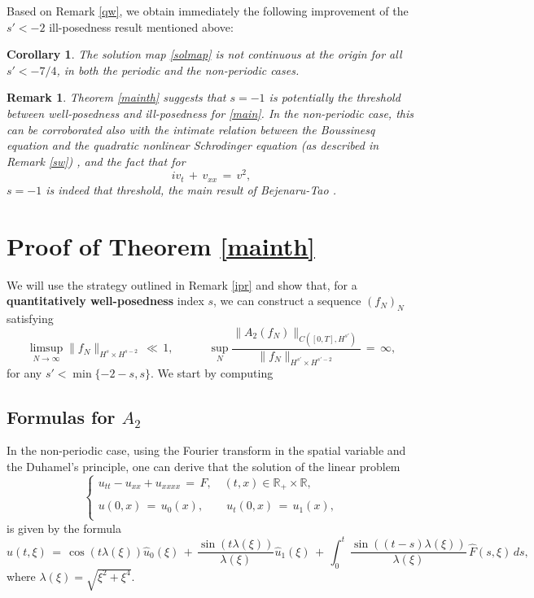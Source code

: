 \documentclass{amsart}
\newtheorem{corollary}[theorem]{Corollary}
\newtheorem{remark}[theorem]{Remark}
\begin{document}
Based on Remark \ref{qw}, we obtain immediately the following improvement of the $s'<-2$ ill-posedness result mentioned above:

\begin{corollary}
The solution map \eqref{solmap} is not continuous at the origin for all $s'<-7/4$, in both the periodic and the non-periodic cases.
\end{corollary}

\begin{remark}
Theorem \ref{mainth} suggests that $s=-1$ is potentially the threshold between well-posedness and ill-posedness for \eqref{main}.  In the non-periodic case, this can be corroborated also with the intimate relation between the Boussinesq equation and the quadratic nonlinear Schrodinger equation (as described in Remark \ref{sw}) , and the fact that for 
\[
iv_t\,+\,v_{xx}\,=\,v^2,
\]
$s=-1$ is indeed that threshold, the main result of Bejenaru-Tao \cite{BT06}. 
\end{remark}


\section{Proof of Theorem \ref{mainth}}
We will use the strategy outlined in Remark \ref{ipr} and show that, for a \textbf{quantitatively well-posedness}  index $s$, we can construct a sequence $(f_N)_N$ satisfying
\[
\limsup_{N\to \infty} \|f_N\|_{H^s \times H^{s-2}}\,\ll\,1, \qquad \quad \sup_N \frac{\|A_2(f_N)\|_{C([0,T],H^{s'})}}{\|f_N\|_{H^{s'} \times H^{s'-2}}}\,=\,\infty,\]
for any $s'< \min\{-2-s, s\}$. We start by computing


\subsection{Formulas for $A_2$} In the non-periodic case, using the Fourier transform in the spatial variable and the Duhamel's principle, one can derive that the solution of the linear problem
\begin{equation}
\left\{
\begin{array}{l}
u_{tt}-u_{xx}+u_{xxxx}\,=\,F, \quad (t,x)\in \mathbb{R}_+\times\mathbb{R},\\
\\
u(0,x)\,=\,u_0(x),\qquad u_t(0,x)\,=\,u_1(x),\\
\end{array}\right.
\label{hom}
\end{equation}
is given by the formula
\begin{equation}
\hat{u}(t,\xi)\,=\,\cos(t \lambda(\xi)) \hat{u}_0(\xi)\,+\,\frac{\sin(t \lambda(\xi))}{\lambda(\xi)} \hat{u}_1(\xi)\,+\,\int_0^t\,\frac{\sin((t-s) \lambda(\xi))}{\lambda(\xi)} \,\hat{F}(s,\xi)\,ds,
\label{lin}\end{equation}
where $\lambda(\xi)=\sqrt{\xi^2+\xi^4}$. 
\end{document}
